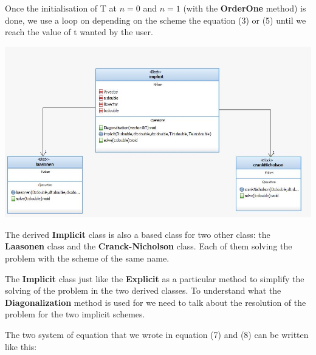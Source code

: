 \documentclass [10 pt, a4 paper]{article}
\begin{document}
Once the initialisation of T at $n = 0$ and $n = 1$ (with the \textbf{OrderOne} method) 
is done, we use a loop on depending on the scheme the equation (3) or (5) until we reach 
the value of t wanted by the user.

\begin{center} 
    \includegraphics[scale=0.6]{Chart/Implicit.JPG}
\end{center}

\vspace{0.3cm}

The derived \textbf{Implicit} class is also a based class for two other class: the 
\textbf{Laasonen} class and the \textbf{Cranck-Nicholson} class. Each of them solving 
the problem with the scheme of the same name.

The \textbf{Implicit} class just like the \textbf{Explicit} as a particular method to 
simplify the solving of the problem in the two derived classes. To understand what the 
\textbf{Diagonalization} method is used for we need to talk about
the resolution of the problem for the two implicit schemes.

\vspace{0.3cm}

The two system of equation that we wrote in equation (7) and (8) can be written like this:
\end{document}

